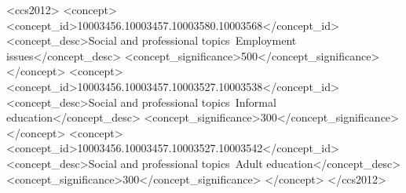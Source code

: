 \begin{CCSXML}
<ccs2012>
    <concept>
        <concept_id>10003456.10003457.10003580.10003568</concept_id>
        <concept_desc>Social and professional topics~Employment issues</concept_desc>
        <concept_significance>500</concept_significance>
    </concept>
    <concept>
        <concept_id>10003456.10003457.10003527.10003538</concept_id>
        <concept_desc>Social and professional topics~Informal education</concept_desc>
        <concept_significance>300</concept_significance>
    </concept>
    <concept>
        <concept_id>10003456.10003457.10003527.10003542</concept_id>
        <concept_desc>Social and professional topics~Adult education</concept_desc>
        <concept_significance>300</concept_significance>
    </concept>
 </ccs2012>
\end{CCSXML}



